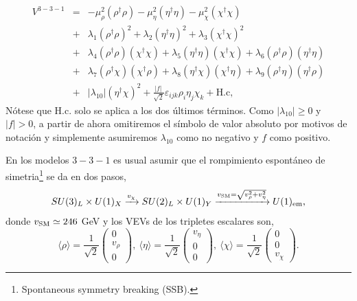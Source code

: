 \begin{eqnarray}
V^{3-3-1} &=& -\mu_\rho^2 \left( \rho^{\dagger}\rho \right) -\mu_\eta^2 \left( \eta^{\dagger}\eta \right) -\mu_\chi^2 \left( \chi^{\dagger}\chi \right) \nonumber \\
&+& \lambda_1 \left( \rho^{\dagger}\rho \right)^2 + \lambda_2 \left( \eta^{\dagger}\eta \right)^2 + \lambda_3 \left( \chi^{\dagger}\chi \right)^2 \nonumber \\
&+& \lambda_4 \left( \rho^{\dagger}\rho \right) \left( \chi^{\dagger}\chi \right) + \lambda_5 \left( \eta^{\dagger}\eta \right) \left( \chi^{\dagger}\chi \right) + \lambda_6 \left( \rho^{\dagger}\rho \right) \left( \eta^{\dagger}\eta \right) \nonumber \\
&+& \lambda_7 \left( \rho^{\dagger}\chi \right) \left( \chi^{\dagger}\rho \right) + \lambda_8 \left( \eta^{\dagger}\chi \right) \left( \chi^{\dagger}\eta \right) + \lambda_9 \left( \rho^{\dagger}\eta \right) \left( \eta^{\dagger}\rho \right) \nonumber \\
&+& |\lambda_{10}| \left( \eta^{\dagger}\chi \right)^2 + \frac{|f| \,}{\sqrt{2}} \varepsilon_{ijk} \rho_i \eta_j \chi_k + \text{H.c},
\label{V331Ec}
\end{eqnarray} 
Nótese que H.c. solo se aplica a los dos últimos términos. Como $|\lambda_{10}|\geq 0$ y $|f|>0$, a partir de ahora omitiremos el símbolo de valor absoluto por motivos de notación y simplemente asumiremos $\lambda_{10}$ como no negativo y $f$ como positivo.

En los modelos $3-3-1$ es usual asumir que el rompimiento espontáneo de simetria\footnote{Spontaneous symmetry breaking (SSB).} se da en dos pasos,
\begin{equation}
SU(3)_L\times U(1)_X \xrightarrow[]{  v_\chi  } SU(2)_L\times U(1)_Y \xrightarrow[]{ v_{\rm SM} = \sqrt{v_\rho^2+ v_\eta^2} } U(1)_{\rm em} ,
\end{equation}
donde $v_{\rm SM} \simeq 246$ GeV y los VEVs de los tripletes escalares son,
\begin{equation}
\langle \rho \rangle =  \frac{1}{\sqrt{2}} \left( 
\begin{array}{c}
0 \\ v_\rho \\ 0 
\end{array}
\right), \
\langle \eta \rangle =  \frac{1}{\sqrt{2}} \left( 
\begin{array}{c}
v_\eta \\ 0 \\ 0 
\end{array}
\right), \
\langle \chi \rangle =  \frac{1}{\sqrt{2}} \left( 
\begin{array}{c}
0 \\ 0 \\ v_\chi
\end{array}
\right).  
\end{equation}

